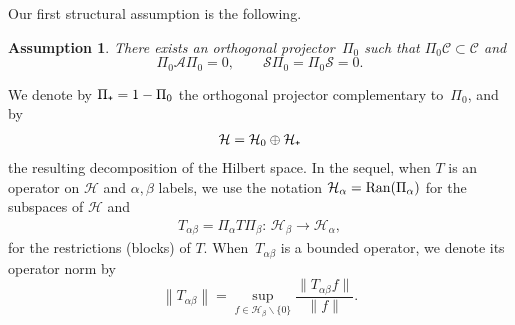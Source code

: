 \documentclass{article}
\newtheorem{assumption}{Assumption}
\newcommand{\cLs}{\mathcal{S}}
\newcommand{\cLa}{\mathcal{A}}
\newcommand{\cH}{\mathcal{H}}
\newcommand{\subplus}{\textnormal{\texttt{+}}}
\begin{document}
Our first structural assumption is the following.
\begin{assumption}
\label{ass:structural_Pi}
There exists an orthogonal projector~$\Pi_{0}$ such that $\Pi_{0}
\mathscr{C} \subset \mathscr{C}$ and
  \begin{equation}
  \label{eq:conditions_L_Pi}
  \Pi_{0} \cLa \Pi_{0} = 0, \qquad \cLs \Pi_{0} = \Pi_{0} \cLs = 0.
\end{equation}
\end{assumption}
We denote by $\Pi_{\subplus} = 1 - \Pi_{0}$ the orthogonal projector complementary to~$\Pi_{0}$, and
by
\begin{align*}
  \cH = \cH_0 \oplus \cH_\subplus
\end{align*}
the resulting decomposition of the Hilbert space. In the sequel, when
$T$ is an operator on $\cH$ and $\alpha,\beta$ labels, we use the notation
$\cH_\alpha = {\rm Ran}(\Pi_\alpha)$ for the subspaces of $\cH$ and
\begin{align*}
  T_{\alpha\beta} =  \Pi_{\alpha} T \Pi_{\beta}:\, \cH_{\beta} \to \cH_{\alpha}, 
\end{align*}
for the restrictions (blocks) of $T$. When~$T_{\alpha\beta}$ is a bounded operator, we denote its operator norm by
\[
\left\|T_{\alpha\beta}\right\| = \sup_{f \in \cH_\beta \backslash \{0\}} \frac{\|T_{\alpha\beta}f\|}{\|f\|}.
\]
\end{document}
